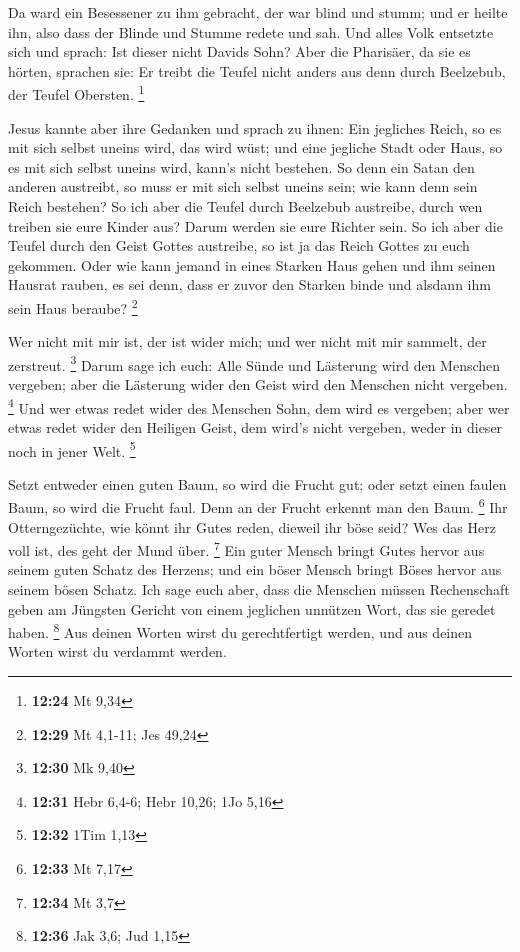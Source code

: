  Da ward ein Besessener zu ihm gebracht, der war blind
und stumm; und er heilte ihn, also dass der Blinde und Stumme redete und
sah.  Und alles Volk entsetzte sich und sprach: Ist
dieser nicht Davids Sohn?  Aber die Pharisäer, da sie es
hörten, sprachen sie: Er treibt die Teufel nicht anders aus denn durch
Beelzebub, der Teufel Obersten. \footnote{\textbf{12:24} Mt 9,34}

 Jesus kannte aber ihre Gedanken und sprach zu ihnen: Ein
jegliches Reich, so es mit sich selbst uneins wird, das wird wüst; und
eine jegliche Stadt oder Haus, so es mit sich selbst uneins wird, kann's
nicht bestehen.  So denn ein Satan den anderen austreibt,
so muss er mit sich selbst uneins sein; wie kann denn sein Reich
bestehen?  So ich aber die Teufel durch Beelzebub
austreibe, durch wen treiben sie eure Kinder aus? Darum werden sie eure
Richter sein.  So ich aber die Teufel durch den Geist
Gottes austreibe, so ist ja das Reich Gottes zu euch gekommen.
 Oder wie kann jemand in eines Starken Haus gehen und ihm
seinen Hausrat rauben, es sei denn, dass er zuvor den Starken binde und
alsdann ihm sein Haus beraube? \footnote{\textbf{12:29} Mt 4,1-11; Jes
  49,24}

 Wer nicht mit mir ist, der ist wider mich; und wer nicht
mit mir sammelt, der zerstreut. \footnote{\textbf{12:30} Mk 9,40}
 Darum sage ich euch: Alle Sünde und Lästerung wird den
Menschen vergeben; aber die Lästerung wider den Geist wird den Menschen
nicht vergeben. \footnote{\textbf{12:31} Hebr 6,4-6; Hebr 10,26; 1Jo
  5,16}  Und wer etwas redet wider des Menschen Sohn, dem
wird es vergeben; aber wer etwas redet wider den Heiligen Geist, dem
wird's nicht vergeben, weder in dieser noch in jener Welt. \footnote{\textbf{12:32}
  1Tim 1,13}

 Setzt entweder einen guten Baum, so wird die Frucht gut;
oder setzt einen faulen Baum, so wird die Frucht faul. Denn an der
Frucht erkennt man den Baum. \footnote{\textbf{12:33} Mt 7,17}
 Ihr Otterngezüchte, wie könnt ihr Gutes reden, dieweil
ihr böse seid? Wes das Herz voll ist, des geht der Mund über.
\footnote{\textbf{12:34} Mt 3,7}  Ein guter Mensch bringt
Gutes hervor aus seinem guten Schatz des Herzens; und ein böser Mensch
bringt Böses hervor aus seinem bösen Schatz.  Ich sage
euch aber, dass die Menschen müssen Rechenschaft geben am Jüngsten
Gericht von einem jeglichen unnützen Wort, das sie geredet haben.
\footnote{\textbf{12:36} Jak 3,6; Jud 1,15}  Aus deinen
Worten wirst du gerechtfertigt werden, und aus deinen Worten wirst du
verdammt werden.

